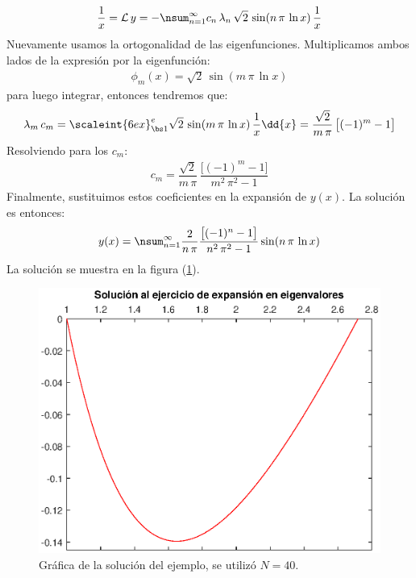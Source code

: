 \begin{ejemplo}
\begin{align*}
\dfrac{1}{x} = \mathcal{L} \, y = - \nsum_{n=1}^{\infty} c_{n} \, \lambda_{n} \, \sqrt{2} \, \sin (n \, \pi \, \ln x) \, \dfrac{1}{x}
\end{align*}
Nuevamente usamos la ortogonalidad de las eigenfunciones. Multiplicamos ambos lados de la expresión por la eigenfunción:
\begin{align*}
\phi_{m} (x) = \sqrt{2} \, \sin (m \, \pi \, \ln x)
\end{align*}
para luego integrar, entonces tendremos que:
\begin{align*}
\lambda_{m} \, c_{m} = \scaleint{6ex}_{\bs 1}^{e} \sqrt{2} \, \sin (m \, \pi \, \ln x) \, \dfrac{1}{x} \dd{x} = \dfrac{\sqrt{2}}{m \, \pi} \, \big[ (-1)^{m} - 1 \big]
\end{align*}
Resolviendo para los $c_{m}$:
\begin{align*}
c_{m} = \dfrac{\sqrt{2}}{m \, \pi} \, \dfrac{\big[ (-1)^{m} - 1 \big]}{m^{2} \, \pi^{2} - 1}
\end{align*}
Finalmente, sustituimos estos coeficientes en la expansión de $y (x)$. La solución es entonces:
\begin{align*}
y (x) = \nsum_{n=1}^{\infty} \dfrac{2}{n \, \pi} \dfrac{\big[ (-1)^{n} - 1 \big]}{n^{2} \, \pi^{2} - 1} \sin (n \, \pi \, \ln x)
\end{align*}
La solución se muestra en la figura (\ref{fig:figura_04_03}).
\begin{figure}[H]
    \centering
    \includegraphics[scale=1]{Imagenes/Expansion_Eigenfunciones_02.eps}
    \caption{Gráfica de la solución del ejemplo, se utilizó $N = 40$.}
    \label{fig:figura_04_03}
\end{figure}
\end{ejemplo}


